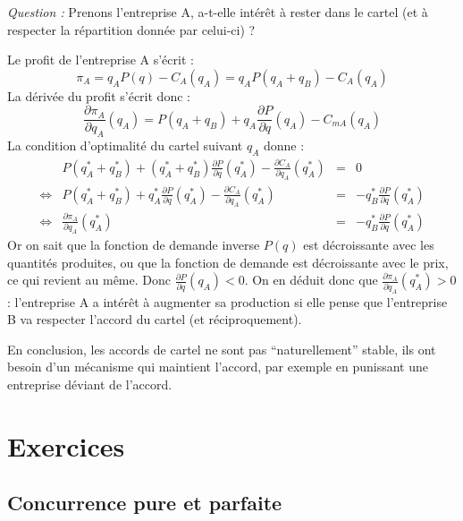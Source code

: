 \documentclass[
]{book}
\theoremstyle{definition}
\theoremstyle{definition}
\theoremstyle{definition}
\theoremstyle{definition}
\theoremstyle{remark}
\begin{document}
\emph{Question :} Prenons l'entreprise A, a-t-elle intérêt à rester dans le cartel (et à respecter la répartition donnée par celui-ci) ?

Le profit de l'entreprise A s'écrit :
\[
\pi_A=q_AP(q)-C_A(q_A)=q_AP(q_A+q_B)-C_A(q_A)
\]
La dérivée du profit s'écrit donc :
\[
\frac{\partial\pi_A}{\partial q_A}(q_A)=P(q_A+q_B)+q_A\frac{\partial P}{\partial q}(q_A)-C_{mA}(q_A)
\]
La condition d'optimalité du cartel suivant \(q_A\) donne :
\[
\begin{array}{crcl}
& P(q_A^*+q_B^*) + (q_A^*+q_B^*)\frac{\partial P}{\partial q}(q_A^*)-\frac{\partial C_A}{\partial q_A}(q_A^*)& = &0\\
\Leftrightarrow &  P(q_A^*+q_B^*) + q_A^*\frac{\partial P}{\partial q}(q_A^*)-\frac{\partial C_A}{\partial q_A}(q_A^*)& = &-q_B^*\frac{\partial P}{\partial q}(q_A^*)\\
\Leftrightarrow & \frac{\partial\pi_A}{\partial q_A}(q_A^*)& =  &-q_B^*\frac{\partial P}{\partial q}(q_A^*)
 \end{array}
\]
Or on sait que la fonction de demande inverse \(P(q)\) est décroissante avec les quantités produites, ou que la fonction de demande est décroissante avec le prix, ce qui revient au même.
Donc \(\frac{\partial P}{\partial q}(q_A)<0\).
On en déduit donc que \(\frac{\partial\pi_A}{\partial q_A}(q_A^*)>0\) : l'entreprise A a intérêt à augmenter sa production si elle pense que l'entreprise B va respecter l'accord du cartel (et réciproquement).

En conclusion, les accords de cartel ne sont pas ``naturellement'' stable, ils ont besoin d'un mécanisme qui maintient l'accord, par exemple en punissant une entreprise déviant de l'accord.

\hypertarget{exercices}{%
\chapter{Exercices}\label{exercices}}

\hypertarget{concurrence-pure-et-parfaite}{%
\section{Concurrence pure et parfaite}\label{concurrence-pure-et-parfaite}}
\end{document}

